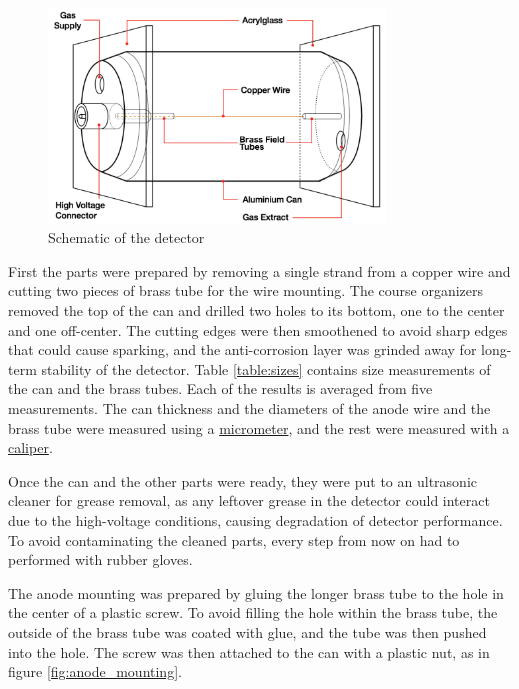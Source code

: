 \documentclass[a4paper]{article}
\begin{document}
\begin{figure}[ht!]
\centering
\includegraphics[width=0.8\textwidth]{fig/instructions/schematic.png}
\caption{Schematic of the detector \cite{instructions}}
\label{fig:schematic}
\end{figure}

First the parts were prepared by removing a single strand from a copper wire and cutting two pieces of brass tube for the wire mounting.
The course organizers removed the top of the can and drilled two holes to its bottom, one to the center and one off-center.
The cutting edges were then smoothened to avoid sharp edges that could cause sparking, and the anti-corrosion layer was grinded away for long-term stability of the detector.
Table \ref{table:sizes} contains size measurements of the can and the brass tubes.
Each of the results is averaged from five measurements.
The can thickness and the diameters of the anode wire and the brass tube were measured using a
\href{https://en.wikipedia.org/wiki/Micrometer}{micrometer}, and the rest were measured with a
\href{https://en.wikipedia.org/wiki/Calipers}{caliper}.

Once the can and the other parts were ready, they were put to an ultrasonic cleaner for grease removal, as any leftover grease in the detector could interact due to the high-voltage conditions, causing degradation of detector performance.
To avoid contaminating the cleaned parts, every step from now on had to performed with rubber gloves.

The anode mounting was prepared by gluing the longer brass tube to the hole in the center of a plastic screw.
To avoid filling the hole within the brass tube, the outside of the brass tube was coated with glue, and the tube was then pushed into the hole.
The screw was then attached to the can with a plastic nut, as in figure \ref{fig:anode_mounting}.
\end{document}
